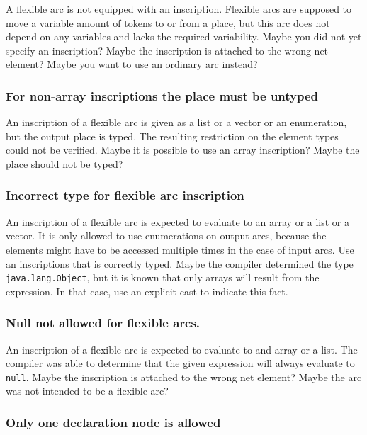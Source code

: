 A flexible arc is not equipped with an inscription.
Flexible arcs are supposed to move a variable amount
of tokens to or from a place, but this arc does not
depend on any variables and lacks the required variability.
Maybe you did not yet specify an inscription?
Maybe the inscription is attached to the wrong net element?
Maybe you want to use an ordinary arc instead?

\subsubsection{For non-array inscriptions the place must be untyped}

An inscription of a flexible arc is given as
a list or a vector or an enumeration, but the output place is typed.
The resulting restriction on the element types could not be verified.
Maybe it is possible to use an array inscription?
Maybe the place should not be typed?

\subsubsection{Incorrect type for flexible arc inscription}

An inscription of a flexible arc is expected to evaluate to
an array or a list or a vector.
It is only allowed to use enumerations on output arcs,
because the elements might have to be accessed multiple times
in the case of input arcs.
Use an inscriptions that is correctly typed.
Maybe the compiler determined the type \texttt{java.lang.Object},
but it is known that only arrays will result from the expression.
In that case, use an explicit cast to indicate this fact.

\subsubsection{Null not allowed for flexible arcs.}

An inscription of a flexible arc is expected to evaluate to
and array or a list. The compiler was able to determine that
the given expression will always evaluate to \texttt{null}.
Maybe the inscription is attached to the wrong net element?
Maybe the arc was not intended to be a flexible arc?

\subsubsection{Only one declaration node is allowed}

